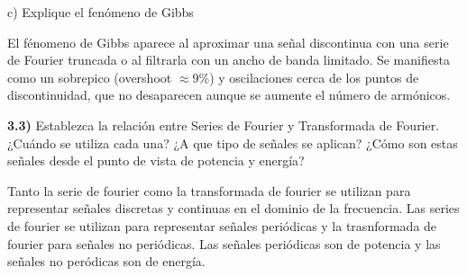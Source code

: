    \noindent c) Explique el fenómeno de Gibbs
   \bigskip
   
    El fénomeno de Gibbs aparece al aproximar una señal discontinua con una serie de Fourier truncada o al filtrarla con un ancho de banda limitado. Se manifiesta como un sobrepico (overshoot $\approx 9\%$) y oscilaciones cerca de los puntos de discontinuidad, que no desaparecen aunque se aumente el número de armónicos.


    \bigskip
\textbf{3.3)} Establezca la relación entre Series de Fourier y Transformada de Fourier. ¿Cuándo se utiliza cada una? ¿A que tipo de señales se aplican? ¿Cómo son estas señales desde el punto de vista de potencia y energía?
\bigskip

Tanto la serie de fourier como la transformada de fourier se utilizan para representar señales discretas y continuas en el dominio de la frecuencia.
Las series de fourier se utilizan para representar señales periódicas y la trasnformada de fourier para señales no periódicas. Las señales periódicas son de potencia y las señales no peródicas son de energía.

\bigskip

